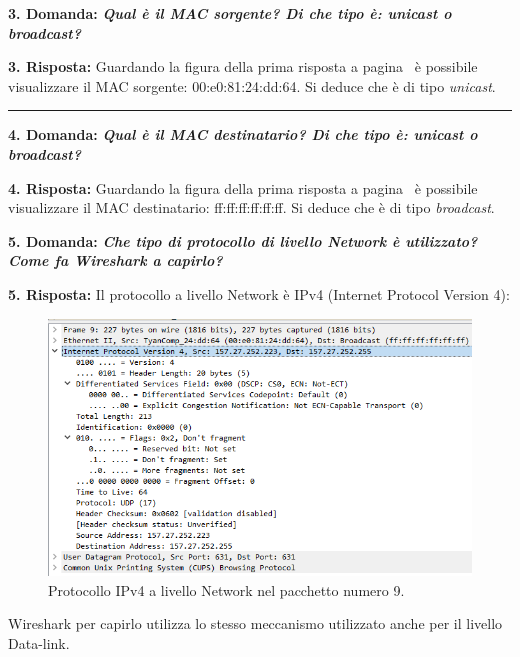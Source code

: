 \documentclass[a4paper]{article}
\newcommand{\longline}{\noindent\rule{\textwidth}{0.4pt}}
\begin{document}
	\noindent
	\textcolor{Red3}{\textbf{3. Domanda:}} \textbf{\emph{Qual è il MAC sorgente? Di che tipo è: unicast o broadcast?}}\newline
	
	\noindent
	\textcolor{Green4}{\textbf{3. Risposta:}} Guardando la figura della prima risposta a pagina~\pageref{fig:header-ex1} è possibile visualizzare il MAC sorgente: 00:e0:81:24:dd:64. Si deduce che è di tipo \emph{unicast}.\newline
	
	\longline\newline
	
	\noindent
	\textcolor{Red3}{\textbf{4. Domanda:}} \textbf{\emph{Qual è il MAC destinatario? Di che tipo è: unicast o broadcast?}}\newline
	
	\noindent
	\textcolor{Green4}{\textbf{4. Risposta:}} Guardando la figura della prima risposta a pagina~\pageref{fig:header-ex1} è possibile visualizzare il MAC destinatario: ff:ff:ff:ff:ff:ff. Si deduce che è di tipo \emph{broadcast}.\newpage
	
	\noindent
	\textcolor{Red3}{\textbf{5. Domanda:}} \textbf{\emph{Che tipo di protocollo di livello Network è utilizzato? Come fa Wireshark a capirlo?}}\newline
	
	\noindent
	\textcolor{Green4}{\textbf{5. Risposta:}} Il protocollo a livello Network è IPv4 (Internet Protocol Version 4):
	\begin{figure}[!htp]
		\centering
		\includegraphics[width=\textwidth]{img/wireshark/ex1-3.png}
		\caption{Protocollo IPv4 a livello Network nel pacchetto numero 9.}
	\end{figure}
	
	\noindent
	Wireshark per capirlo utilizza lo stesso meccanismo utilizzato anche per il livello Data-link.
	
\end{document}
